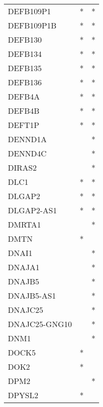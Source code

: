 \begin{longtable}{lcc}
DEFB109P1             &              * &          * \\
DEFB109P1B            &              * &          * \\
DEFB130               &              * &          * \\
DEFB134               &              * &          * \\
DEFB135               &              * &          * \\
DEFB136               &              * &          * \\
DEFB4A                &              * &          * \\
DEFB4B                &              * &          * \\
DEFT1P                &              * &          * \\
DENND1A               &                &          * \\
DENND4C               &                &          * \\
DIRAS2                &                &          * \\
DLC1                  &              * &          * \\
DLGAP2                &              * &          * \\
DLGAP2-AS1            &              * &          * \\
DMRTA1                &                &          * \\
DMTN                  &              * &            \\
DNAI1                 &                &          * \\
DNAJA1                &                &          * \\
DNAJB5                &                &          * \\
DNAJB5-AS1            &                &          * \\
DNAJC25               &                &          * \\
DNAJC25-GNG10         &                &          * \\
DNM1                  &                &          * \\
DOCK5                 &              * &            \\
DOK2                  &              * &            \\
DPM2                  &                &          * \\
DPYSL2                &              * &            \\

\end{longtable}
